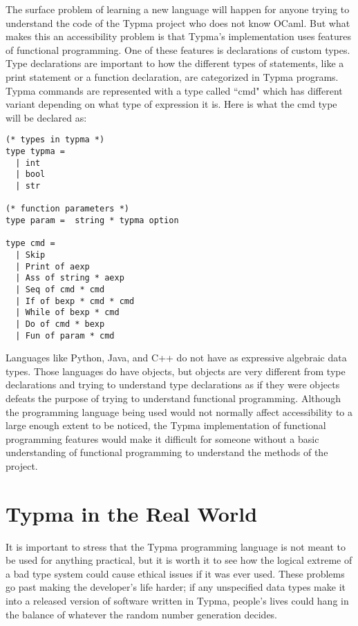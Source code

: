 \documentclass[10pt,twocolumn]{article}
\begin{document}
The surface problem of learning a new language will happen for anyone trying to understand the code of the Typma project who does not know OCaml. But what makes this an accessibility problem is that Typma's implementation uses features of functional programming. One of these features is declarations of custom types. Type declarations are important to how the different types of statements, like a print statement or a function declaration, are categorized in Typma programs. Typma commands are represented with a type called ``cmd" which has different variant depending on what type of expression it is. Here is what the cmd type will be declared as:

\begin{lstlisting}
(* types in typma *)
type typma =
  | int
  | bool
  | str

(* function parameters *)
type param =  string * typma option

type cmd =
  | Skip
  | Print of aexp
  | Ass of string * aexp
  | Seq of cmd * cmd
  | If of bexp * cmd * cmd
  | While of bexp * cmd
  | Do of cmd * bexp
  | Fun of param * cmd
\end{lstlisting}

Languages like Python, Java, and C++ do not have as expressive algebraic data types. Those languages do have objects, but objects are very different from type declarations and trying to understand type declarations as if they were objects defeats the purpose of trying to understand functional programming. Although the programming language being used would not normally affect accessibility to a large enough extent to be noticed, the Typma implementation of functional programming features would make it difficult for someone without a basic understanding of functional programming to understand the methods of the project.

\section{Typma in the Real World}

It is important to stress that the Typma programming language is not meant to be used for anything practical, but it is worth it to see how the logical extreme of a bad type system could cause ethical issues if it was ever used. These problems go past making the developer's life harder; if any unspecified data types make it into a released version of software written in Typma, people's lives could hang in the balance of whatever the random number generation decides.
\end{document}
